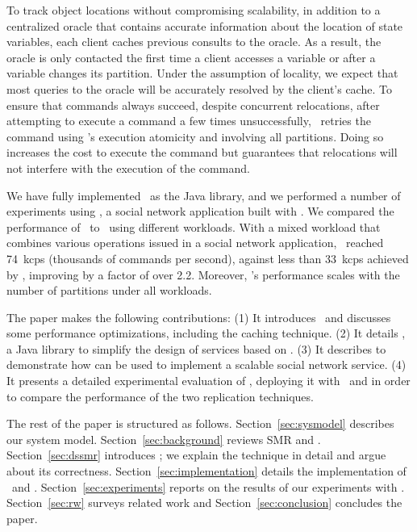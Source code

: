 To track object locations without compromising scalability, in addition to a centralized oracle that contains accurate information about the location of state variables, each client caches previous consults to the oracle.
As a result, the oracle is only contacted the first time a client accesses a variable or after a variable changes its partition.
Under the assumption of locality, we expect that most queries to the oracle will be accurately resolved by the client's cache.
To ensure that commands always succeed, despite concurrent relocations, after attempting to execute a command a few times unsuccessfully, \dssmr\ retries the command using \ssmr{}'s execution atomicity and involving all partitions.
Doing so increases the cost to execute the command but guarantees that relocations will not interfere with the execution of the command.

We have fully implemented \dssmr\ as the \libname{} Java library, and we performed a number of experiments using \appname{}, a social network application built with \libname{}.
We compared the performance of \dssmr\ to \ssmr\ using different workloads.
With a mixed workload that combines various operations issued in a social network application, \dssmr\ reached 74~kcps (thousands of commands per second), against less than 33~kcps achieved by \ssmr{}, improving by a factor of over 2.2.
Moreover, \dssmr's performance scales with the number of partitions under all workloads.

The paper makes the following contributions:
(1) It introduces \dssmr\ and discusses some performance optimizations, including the caching technique.
(2) It details \libname{}, a Java library to simplify the design of services based on \dssmr{}.
(3) It describes \appname{} to demonstrate how \libname{} can be used to implement a scalable social network service.
(4) It presents a detailed experimental evaluation of \appname{}, deploying it with \ssmr\ and \dssmr{} in order to compare the performance of the two replication techniques.

The rest of the paper is structured as follows.
Section~\ref{sec:sysmodel} describes our system model.
Section~\ref{sec:background} reviews SMR and \ssmrshort{}.
Section~\ref{sec:dssmr} introduces \dssmr{}; we explain the technique in detail and argue about its correctness.
Section~\ref{sec:implementation} details the implementation of \libname\ and \appname{}.
Section~\ref{sec:experiments} reports on the results of our experiments with \dssmr{}.
Section~\ref{sec:rw} surveys related work and
Section~\ref{sec:conclusion} concludes the paper.





